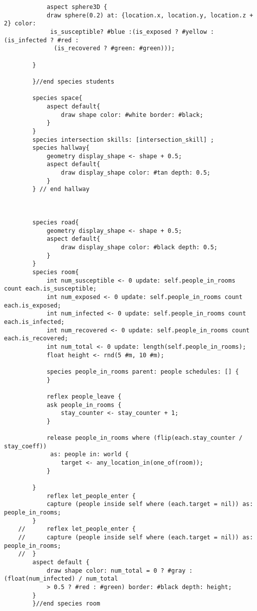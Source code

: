 \begin{lstlisting}
            aspect sphere3D {
            draw sphere(0.2) at: {location.x, location.y, location.z + 2} color:
             is_susceptible? #blue :(is_exposed ? #yellow : (is_infected ? #red :
              (is_recovered ? #green: #green)));
        
        }
            
        }//end species students
        
        species space{
            aspect default{
                draw shape color: #white border: #black;
            }
        }
        species intersection skills: [intersection_skill] ;
        species hallway{
            geometry display_shape <- shape + 0.5;
            aspect default{
                draw display_shape color: #tan depth: 0.5;
            }
        } // end hallway
        
   
        
        species road{
            geometry display_shape <- shape + 0.5;
            aspect default{
                draw display_shape color: #black depth: 0.5;
            }
        }
        species room{
            int num_susceptible <- 0 update: self.people_in_rooms count each.is_susceptible;
            int num_exposed <- 0 update: self.people_in_rooms count each.is_exposed;
            int num_infected <- 0 update: self.people_in_rooms count each.is_infected;
            int num_recovered <- 0 update: self.people_in_rooms count each.is_recovered;
            int num_total <- 0 update: length(self.people_in_rooms);
            float height <- rnd(5 #m, 10 #m);
            
            species people_in_rooms parent: people schedules: [] {
            }
            
            reflex people_leave {
            ask people_in_rooms {
                stay_counter <- stay_counter + 1;
            }
    
            release people_in_rooms where (flip(each.stay_counter / stay_coeff))
             as: people in: world {
                target <- any_location_in(one_of(room));
            }
    
        }
            reflex let_people_enter {
            capture (people inside self where (each.target = nil)) as: people_in_rooms;
        }
    //		reflex let_people_enter {
    //		capture (people inside self where (each.target = nil)) as: people_in_rooms;
    //	}
        aspect default {
            draw shape color: num_total = 0 ? #gray : (float(num_infected) / num_total 
            > 0.5 ? #red : #green) border: #black depth: height;
        }
        }//end species room
        

\end{lstlisting}
